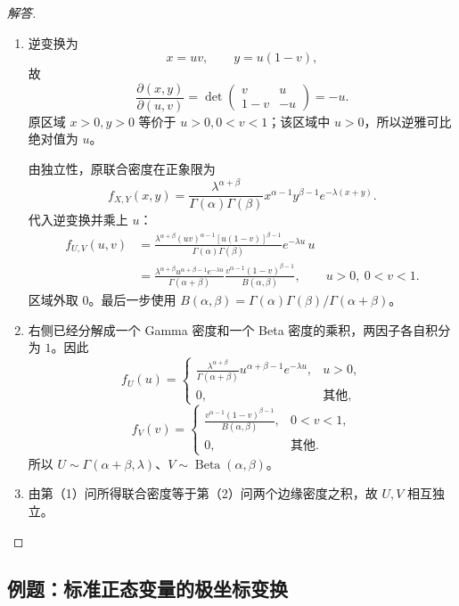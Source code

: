\begin{proof}[解答]
\begin{enumerate}
\item 逆变换为
\[
x=uv,\qquad y=u(1-v),
\]
故
\[
\frac{\partial(x,y)}{\partial(u,v)}
=\det\begin{pmatrix}v&u\\1-v&-u\end{pmatrix}=-u.
\]
原区域 $x>0,y>0$ 等价于 $u>0,0<v<1$；该区域中 $u>0$，所以逆雅可比绝对值为 $u$。

由独立性，原联合密度在正象限为
\[
f_{X,Y}(x,y)=
\frac{\lambda^{\alpha+\beta}}{\Gamma(\alpha)\Gamma(\beta)}
x^{\alpha-1}y^{\beta-1}e^{-\lambda(x+y)}.
\]
代入逆变换并乘上 $u$：
\begin{align*}
f_{U,V}(u,v)
&=\frac{\lambda^{\alpha+\beta}
 (uv)^{\alpha-1}[u(1-v)]^{\beta-1}}
 {\Gamma(\alpha)\Gamma(\beta)}e^{-\lambda u}\,u\\
&=\frac{\lambda^{\alpha+\beta}
 u^{\alpha+\beta-1}e^{-\lambda u}}
 {\Gamma(\alpha+\beta)}
 \frac{v^{\alpha-1}(1-v)^{\beta-1}}{B(\alpha,\beta)},
\qquad u>0,\ 0<v<1.
\end{align*}
区域外取 $0$。最后一步使用
$B(\alpha,\beta)=\Gamma(\alpha)\Gamma(\beta)/\Gamma(\alpha+\beta)$。

\item 右侧已经分解成一个 Gamma 密度和一个 Beta 密度的乘积，两因子各自积分为 $1$。因此
\[
f_U(u)=
\begin{cases}
\displaystyle\frac{\lambda^{\alpha+\beta}}{\Gamma(\alpha+\beta)}
u^{\alpha+\beta-1}e^{-\lambda u},&u>0,\\
0,&\text{其他},
\end{cases}
\]
\[
f_V(v)=
\begin{cases}
\displaystyle\frac{v^{\alpha-1}(1-v)^{\beta-1}}{B(\alpha,\beta)},&0<v<1,\\
0,&\text{其他}.
\end{cases}
\]
所以 $U\sim\Gamma(\alpha+\beta,\lambda)$、$V\sim\operatorname{Beta}(\alpha,\beta)$。

\item 由第（1）问所得联合密度等于第（2）问两个边缘密度之积，故 $U,V$ 相互独立。
\end{enumerate}
\end{proof}

\subsection{例题：标准正态变量的极坐标变换}\label{note:c3:e20}
